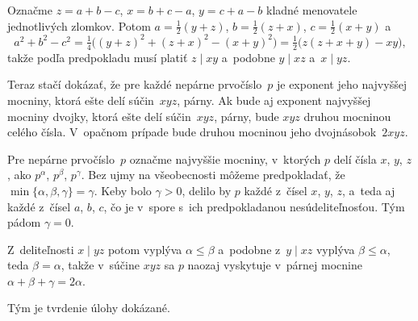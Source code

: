 {%
Označme $z=a+b-c$, $x=b+c-a$, $y=c+a-b$ kladné menovatele
jednotlivých zlomkov. Potom $a=\frac12(y+z)$, $b=\frac12(z+x)$, $c=\frac12(x+y)$
a
$$
a^2+b^2-c^2=\tfrac14\big((y+z)^2+(z+x)^2-(x+y)^2\big)=\tfrac12 \big(z(z+x+y)-xy\big),
$$
takže podľa predpokladu musí platiť $z\mid xy$ a~podobne $y\mid xz$ a~$x\mid yz$.

Teraz stačí dokázať, že pre každé nepárne prvočíslo~$p$ je exponent jeho najvyššej mocniny,
ktorá ešte delí súčin~$xyz$, párny. Ak bude aj exponent najvyššej mocniny
dvojky, ktorá ešte delí súčin~$xyz$, párny,
bude $xyz$ druhou mocninou celého čísla. V~opačnom prípade bude druhou
mocninou jeho dvojnásobok~$2xyz$.

Pre nepárne prvočíslo~$p$ označme najvyššie mocniny, v~ktorých $p$ delí čísla
$x$, $y$, $z$, ako $p^\alpha$, $p^\beta$, $p^\gamma$. Bez ujmy na
všeobecnosti môžeme predpokladať, že $\min\{\alpha,\beta,\gamma\}=\gamma$.
Keby bolo $\gamma>0$, delilo by $p$ každé z~čísel $x$, $y$, $z$, a~teda
aj každé z~čísel $a$, $b$, $c$, čo je v~spore s~ich predpokladanou
nesúdeliteľnosťou. Tým pádom $\gamma=0$.

Z~deliteľnosti $x\mid yz$ potom vyplýva $\alpha\le \beta$ a~podobne z~$y\mid xz$ vyplýva
$\beta\le \alpha$, teda $\beta=\alpha$, takže v~súčine $xyz$ sa $p$
naozaj vyskytuje v~párnej mocnine $\alpha+\beta+\gamma=2\alpha$.

Tým je tvrdenie úlohy dokázané.}

